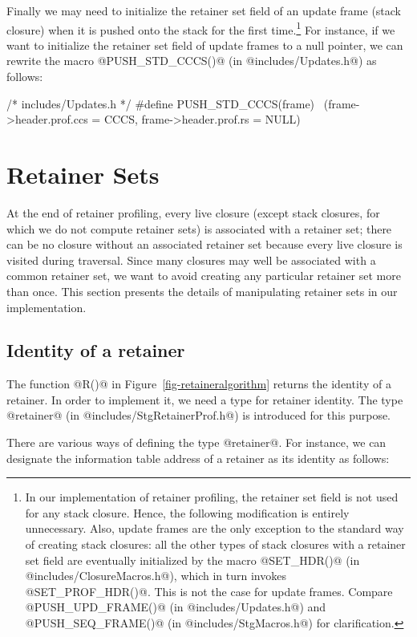 \documentclass{article}
\begin{document}
Finally we may need to initialize the retainer set field of an update frame 
(stack closure) when it is pushed onto the stack for the first 
time.\footnote{In our implementation of
retainer profiling, the retainer set field is not used for any stack closure.
Hence, the following modification is entirely unnecessary.
Also, update frames are the only exception to the standard way of creating
stack closures: all the other types of stack closures with a retainer set 
field are eventually initialized by
the macro @SET\_HDR()@ (in @includes/ClosureMacros.h@), which in turn
invokes @SET\_PROF\_HDR()@. This is not the case for update frames.
Compare @PUSH\_UPD\_FRAME()@ (in @includes/Updates.h@) and  
@PUSH\_SEQ\_FRAME()@ (in @includes/StgMacros.h@) for clarification.}
For instance, if we want to initialize the retainer set field of update
frames to a null pointer, we can rewrite the macro @PUSH_STD_CCCS()@ 
(in @includes/Updates.h@) as follows:

\begin{code}
/* includes/Updates.h */
#define PUSH_STD_CCCS(frame)            \
  (frame->header.prof.ccs = CCCS, frame->header.prof.rs = NULL)
\end{code}

\section{Retainer Sets}

At the end of retainer profiling, every live closure (except stack
closures, for which we do not compute retainer sets) is associated with
a retainer set; there can be no closure without an associated retainer set
because every live closure is visited during traversal.
Since many closures may well be associated with a common retainer set,
we want to avoid creating any particular retainer set more than once.
This section presents the details of manipulating retainer sets in our
implementation.

\subsection{Identity of a retainer}

The function @R()@ in Figure~\ref{fig-retaineralgorithm} returns
the identity of a retainer. In order to implement it, we need 
a type for retainer identity.
The type @retainer@ (in @includes/StgRetainerProf.h@) is introduced for
this purpose. 

There are various ways of defining the type @retainer@. 
For instance, we can designate the information table address of a retainer as
its identity as follows:
\end{document}
